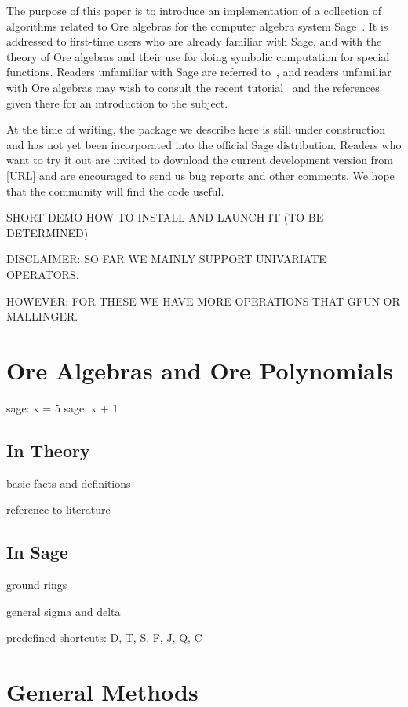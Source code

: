\documentclass{amsart}
\begin{document}
The purpose of this paper is to introduce an implementation of a collection of
algorithms related to Ore algebras for the computer algebra system
Sage~\cite{..}. It is addressed to first-time users who are already familiar
with Sage, and with the theory of Ore algebras and their use for doing symbolic
computation for special functions. Readers unfamiliar with Sage are referred
to~\cite{..}, and readers unfamiliar with Ore algebras may wish to consult the
recent tutorial~\cite{..} and the references given there for an introduction to
the subject.

At the time of writing, the package we describe here is still under construction
and has not yet been incorporated into the official Sage distribution. Readers
who want to try it out are invited to download the current development version
from [URL] and are encouraged to send us bug reports and other comments. We hope
that the community will find the code useful.

SHORT DEMO HOW TO INSTALL AND LAUNCH IT (TO BE DETERMINED)

DISCLAIMER: SO FAR WE MAINLY SUPPORT UNIVARIATE OPERATORS.

HOWEVER: FOR THESE WE HAVE MORE OPERATIONS THAT GFUN OR MALLINGER. 

\section{Ore Algebras and Ore Polynomials}

\begin{sageexample}
  sage: x = 5
  sage: x + 1
\end{sageexample}

\subsection{In Theory}

basic facts and definitions

reference to literature

\subsection{In Sage}

ground rings 

general sigma and delta

predefined shortcuts: D, T, S, F, J, Q, C

\section{General Methods}
\end{document}
